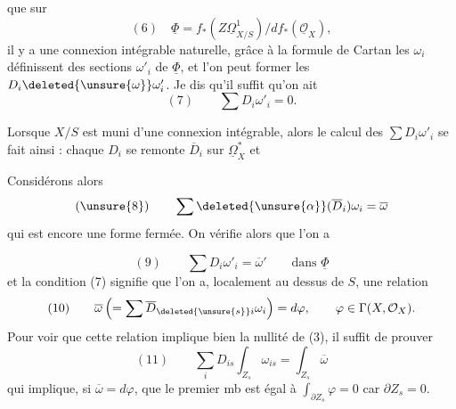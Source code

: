 que  sur
\[
\boxed{(6)\quad \underline\Phi=f_*(Z\underline\Omega^1_{X/S})/df_*(\underline{\mathcal O}_X)},
\]
il y a une connexion intégrable naturelle, grâce à la formule de Cartan  les $\omega_i$ définissent des sections $\omega'_i$ de $\underline\Phi$, et l'on peut former les $D_i\deleted{\unsure{\omega}}\omega'_i$. Je dis qu'il suffit qu'on ait
\[
(7)\qquad \sum D_i\omega'_i=0.
\]

Lorsque $X/S$ est muni d'une connexion intégrable, alors le calcul des $\sum D_i\omega'_i$ se fait ainsi :  chaque $D_i$ se remonte   $\overline D_i$ sur $\underline\Omega^*_X$  et   

\deleted{\[
\boxed{\begin{gathered}
(8)\qquad \alpha_{\overline D_i}\omega_i=\alpha_{\overline D_i^0}\omega_i+c_i\omega_i\\
\left\{\begin{aligned}
\overline D_i&=\overline D_i^0+c_i\,\mathrm{id}\qquad
\left(\begin{array}{l}\overline D_i^0\text{ à coeff. cts}\\c_i\text{ section de }\mathcal O_X\end{array}\right)\\
(9)\qquad \alpha_{\overline D_i^0}d\varphi&=\unsure{d}\overline D_i^0\varphi
\end{aligned}\right.
\end{gathered}}
\]}

Considérons alors
\[
(\unsure{8})\qquad \sum\deleted{\unsure{\alpha}}(\overline D_i)\omega_i=\overline\omega
\]
qui est encore une forme fermée.
On vérifie alors  que l'on a

\[
(9)\qquad \sum D_i\omega'_i=\overline\omega'\qquad\text{dans }\underline\Phi
\]
et la condition (7) signifie que l'on a, localement au dessus de $S$, une relation
\[
(10)\qquad \overline\omega\left(=\sum\overline D_{\deleted{\unsure{s}}i}\omega_i\right)=d\varphi,\qquad \varphi\in\Gamma(X,\mathcal O_X).
\]
Pour voir que cette relation implique bien la nullité de (3), il suffit de prouver
\[
(11)\qquad \sum_i D_{is}\int_{Z_s}\omega_{is}=\int_{Z_s}\overline\omega
\]
qui implique, si $\overline\omega=d\varphi$, que le premier mb est égal à $\int_{\partial Z_s}\varphi=0$ car $\partial Z_s=0$.

